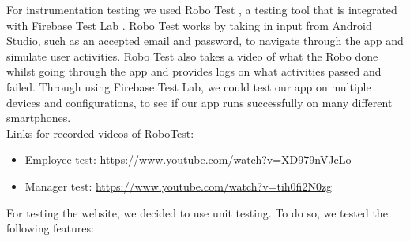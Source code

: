 For instrumentation testing we used Robo Test \cite{robotest}, a testing tool that is integrated with Firebase Test Lab \cite{firebasetestlab}. Robo Test works by taking in input from Android Studio, such as an accepted email and password, to navigate through the app and simulate user activities. Robo Test also takes a video of what the Robo done whilst going through the app and provides logs on what activities passed and failed. Through using Firebase Test Lab, we could test our app on multiple devices and configurations, to see if our app runs successfully on many different smartphones. 
\\
Links for recorded videos of RoboTest:
\begin{itemize}
    \item Employee test: \url{https://www.youtube.com/watch?v=XD979nVJcLo}
    \item Manager test: \url{https://www.youtube.com/watch?v=tih0fi2N0zg}
\end{itemize}

For testing the website, we decided to use unit testing. To do so, we tested the following features:
\\

